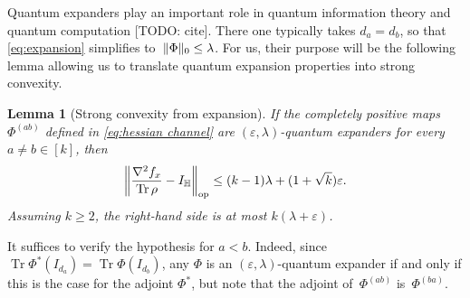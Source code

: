 \documentclass[aos]{imsart}
\newtheorem{lemma}[theorem]{Lemma}
\theoremstyle{definition}
\numberwithin{equation}{section}
\DeclareMathOperator{\op}{op}
\DeclareMathOperator{\tr}{Tr}
\DeclarePairedDelimiter{\norm}{\lVert}{\rVert}
\renewcommand{\H}{{\mathbb{H}}}
\newcommand{\eps}{\varepsilon}
\newcommand{\TODO}[1]{{\color{blue}[TODO: #1]}}
\newcommand{\TODO}[1]{{}}
\begin{document}
Quantum expanders play an important role in quantum information theory and quantum computation \TODO{cite}.
There one typically takes $d_a=d_b$, so that \cref{eq:expansion} simplifies to~$\norm{\Phi}_0 \leq \lambda$.
For us, their purpose will be the following lemma allowing us to translate quantum expansion properties into strong convexity.

\begin{lemma}[Strong convexity from expansion]\label{lem:expansion-convexity}
If the completely positive maps $\Phi^{(ab)}$ defined in \cref{eq:hessian channel} are $(\eps,\lambda)$-quantum expanders for every $a\neq b\in[k]$, then
\begin{align*}
  \norm*{\frac{\nabla^2 f_x}{\tr \rho} - I_\H}_{\op}
\leq (k-1)\lambda + (1 + \sqrt k) \eps.
\end{align*}
Assuming $k\geq2$, the right-hand side is at most $k (\lambda + \eps)$.
\end{lemma}
\noindent
It suffices to verify the hypothesis for $a<b$.
Indeed, since $\tr \Phi^*(I_{d_a}) = \tr \Phi(I_{d_b})$, any $\Phi$ is an $(\eps,\lambda)$-quantum expander if and only if this is the case for the adjoint $\Phi^*$, but note that the adjoint of~$\Phi^{(ab)}$ is~$\Phi^{(ba)}$.
\end{document}
